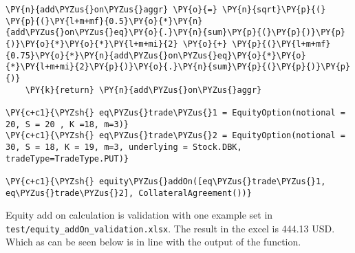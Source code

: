 \begin{tcolorbox}[breakable, size=fbox, boxrule=1pt, pad at break*=1mm,colback=cellbackground, colframe=cellborder]
\begin{Verbatim}[commandchars=\\\{\}]
    \PY{n}{add\PYZus{}on\PYZus{}aggr} \PY{o}{=} \PY{n}{sqrt}\PY{p}{(} \PY{p}{(}\PY{l+m+mf}{0.5}\PY{o}{*}\PY{n}{add\PYZus{}on\PYZus{}eq}\PY{o}{.}\PY{n}{sum}\PY{p}{(}\PY{p}{)}\PY{p}{)}\PY{o}{*}\PY{o}{*}\PY{l+m+mi}{2} \PY{o}{+} \PY{p}{(}\PY{l+m+mf}{0.75}\PY{o}{*}\PY{n}{add\PYZus{}on\PYZus{}eq}\PY{o}{*}\PY{o}{*}\PY{l+m+mi}{2}\PY{p}{)}\PY{o}{.}\PY{n}{sum}\PY{p}{(}\PY{p}{)}\PY{p}{)}
    \PY{k}{return} \PY{n}{add\PYZus{}on\PYZus{}aggr}

\PY{c+c1}{\PYZsh{} eq\PYZus{}trade\PYZus{}1 = EquityOption(notional = 20, S = 20 , K =18, m=3)}
\PY{c+c1}{\PYZsh{} eq\PYZus{}trade\PYZus{}2 = EquityOption(notional = 30, S = 18, K = 19, m=3, underlying = Stock.DBK, tradeType=TradeType.PUT)}

\PY{c+c1}{\PYZsh{} equity\PYZus{}addOn([eq\PYZus{}trade\PYZus{}1, eq\PYZus{}trade\PYZus{}2], CollateralAgreement())}
\end{Verbatim}
\end{tcolorbox}

    Equity add on calculation is validation with one example set in
\texttt{test/equity\_addOn\_validation.xlsx}. The result in the excel is
444.13 USD. Which as can be seen below is in line with the output of the
function.

